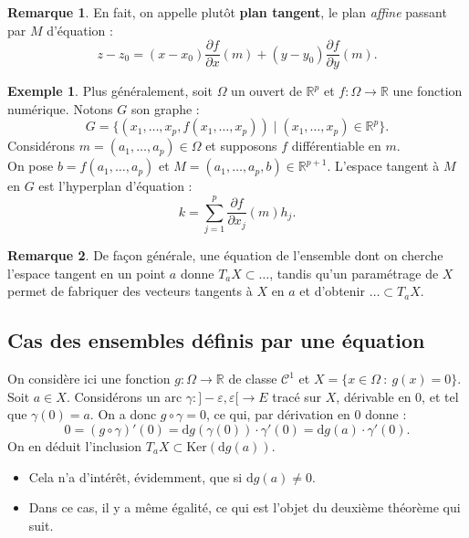 \documentclass[french]{article}
\newcommand{\R}{\mathbb{R}}
\renewcommand{\ker}{\text{Ker}}
\renewcommand{\d}{\text{d}}
\theoremstyle{plain}
\theoremstyle{definition}
\newtheorem*{ex}{Exemple}
\newtheorem*{rmq}{Remarque}
\theoremstyle{remark}
\begin{document}
\begin{rmq}
	En fait, on appelle plutôt \textbf{plan tangent}, le plan \textit{affine} passant par $M$ d'équation :
	$$z-z_0=(x-x_0)\frac{\partial f}{\partial x}(m)+(y-y_0)\frac{\partial f}{\partial y}(m).$$
\end{rmq}

\begin{ex}
	Plus généralement, soit $\Omega$ un ouvert de $\R^p$ et $f:\Omega\to\R$ une fonction numérique. Notons $G$ son graphe :
	$$G=\{(x_1,\ldots,x_p,f(x_1,\ldots,x_p))\mid (x_1,\ldots,x_p)\in\R^p\}.$$
	Considérons $m=(a_1,\ldots,a_p)\in\Omega$ et supposons $f$ différentiable en $m$.\\
	On pose $b=f(a_1,\ldots,a_p)$ et $M=(a_1,\ldots,a_p,b)\in\R^{p+1}$. L'espace tangent à $M$ en $G$ est l'hyperplan d'équation :
	$$k=\sum_{j=1}^{p}\frac{\partial f}{\partial x_j}(m)h_j.$$
\end{ex}

\begin{rmq}
	De façon générale, une équation de l'ensemble dont on cherche l'espace tangent en un point $a$ donne $T_aX\subset\ldots$, tandis qu'un paramétrage de $X$ permet de fabriquer des vecteurs tangents à $X$ en $a$ et d'obtenir $\ldots\subset T_aX$.
\end{rmq}

\subsection{Cas des ensembles définis par une équation}

On considère ici une fonction $g:\Omega\to\R$ de classe $\mathcal{C}^1$ et $X=\{x\in\Omega\ :\ g(x)=0\}$. Soit $a\in X$. Considérons un arc $\gamma:]-\varepsilon,\varepsilon[\to E$ tracé sur $X$, dérivable en $0$, et tel que $\gamma(0)=a$. On a donc $g\circ\gamma=0$, ce qui, par dérivation en $0$ donne :
$$0=(g\circ\gamma)'(0)=\d g(\gamma(0))\cdot\gamma'(0)=\d g(a)\cdot\gamma'(0).$$
On en déduit l'inclusion $T_aX\subset\ker(\d g(a))$.
\begin{itemize}
	\item Cela n'a d'intérêt, évidemment, que si $\d g(a)\ne0$.
	\item Dans ce cas, il y a même égalité, ce qui est l'objet du deuxième théorème qui suit.
\end{itemize}
\end{document}
